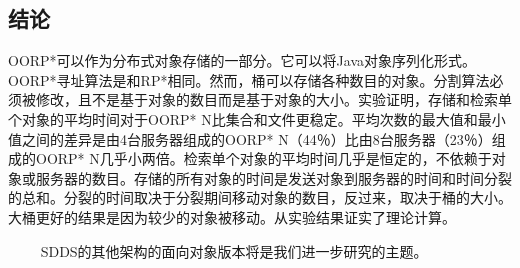 \documentclass[10pt,a4paper]{article}
\begin{document}
\begin{CJK*}{UTF8}{gkai}
\section{结论}
OORP*可以作为分布式对象存储的一部分。它可以将Java对象序列化形式。OORP*寻址算法是和RP*相同。然而，桶可以存储各种数目的对象。分割算法必须被修改，且不是基于对象的数目而是基于对象的大小。实验证明，存储和检索单个对象的平均时间对于OORP* N比集合和文件更稳定。平均次数的最大值和最小值之间的差异是由4台服务器组成的OORP* N（44％）比由8台服务器（23％）组成的OORP* N几乎小两倍。检索单个对象的平均时间几乎是恒定的，不依赖于对象或服务器的数目。存储的所有对象的时间是发送对象到服务器的时间和时间分裂的总和。分裂的时间取决于分裂期间移动对象的数目，反过来，取决于桶的大小。大桶更好的结果是因为较少的对象被移动。从实验结果证实了理论计算。


　　
SDDS的其他架构的面向对象版本将是我们进一步研究的主题。




\clearpage     
\end{CJK*}
\end{document}

